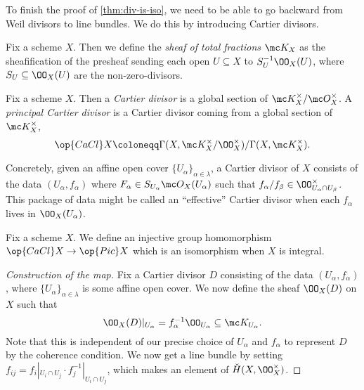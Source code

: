 \documentclass[../notes.tex]{subfiles}
\begin{document}
To finish the proof of \autoref{thm:div-is-iso}, we need to be able to go backward from Weil divisors to line bundles. We do this by introducing Cartier divisors.
\begin{definition}
	Fix a scheme $X$. Then we define the \textit{sheaf of total fractions} $\mc K_X$ as the sheafification of the presheaf sending each open $U\subseteq X$ to $S_U^{-1}\OO_X(U)$, where $S_U\subseteq\OO_X(U)$ are the non-zero-divisors.
\end{definition}
\begin{definition}
	Fix a scheme $X$. Then a \textit{Cartier divisor} is a global section of $\mc K_X^\times/\mc O_X^\times$. A \textit{principal Cartier divisor} is a Cartier divisor coming from a global section of $\mc K_X^\times$,
	\[\op{CaCl}X\coloneqq\Gamma(X,\mc K_X^\times/\OO_X^\times)/\Gamma(X,\mc K_X^\times).\]
\end{definition}
\begin{remark}
	Concretely, given an affine open cover $\{U_\alpha\}_{\alpha\in\lambda}$, a Cartier divisor of $X$ consists of the data $(U_\alpha,f_\alpha)$ where $F_\alpha\in S_{U_\alpha}\mc O_X(U_\alpha)$ such that $f_\alpha/f_\beta\in\OO_{U_\alpha\cap U_\beta}^\times$. This package of data might be called an ``effective'' Cartier divisor when each $f_\alpha$ lives in $\OO_X(U_\alpha)$.
\end{remark}
\begin{proposition}
	Fix a scheme $X$. We define an injective group homomorphism $\op{CaCl}X\to\op{Pic}X$ which is an isomorphism when $X$ is integral.
\end{proposition}
\begin{proof}[Construction of the map]
	Fix a Cartier divisor $D$ consisting of the data $(U_\alpha,f_\alpha)$, where $\{U_\alpha\}_{\alpha\in\lambda}$ is some affine open cover. We now define the sheaf $\OO_X(D)$ on $X$ such that
	\[\OO_X(D)|_{U_\alpha}=f_\alpha^{-1}\OO_{U_\alpha}\subseteq\mc K_{U_\alpha}.\]
	Note that this is independent of our precise choice of $U_\alpha$ and $f_\alpha$ to represent $D$ by the coherence condition. We now get a line bundle by setting $f_{ij}=f_i|_{U_i\cap U_j}\cdot f_j^{-1}|_{U_i\cap U_j}$, which makes an element of $\check H(X,\OO_X^\times)$.
\end{proof}
\end{document}
